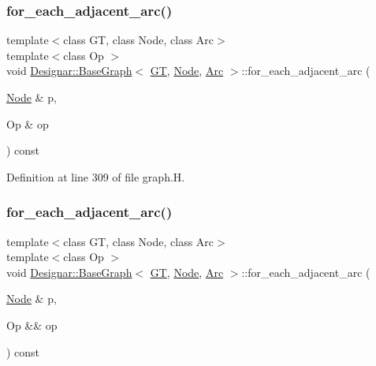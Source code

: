 \subsubsection{\texorpdfstring{for\+\_\+each\+\_\+adjacent\+\_\+arc()}{for\_each\_adjacent\_arc()}\hspace{0.1cm}{\footnotesize\ttfamily [1/2]}}
{\footnotesize\ttfamily template$<$class GT, class Node, class Arc$>$ \\
template$<$class Op $>$ \\
void \hyperlink{class_designar_1_1_base_graph}{Designar\+::\+Base\+Graph}$<$ \hyperlink{demo-buildgraph_8_c_a3001c40d2c31ca87ed96cd7d1334a55e}{GT}, \hyperlink{namespace_designar_a5af326c65aa2bd26b26c410f2030d09e}{Node}, \hyperlink{namespace_designar_a3f55fb5513d62ff47cbc8f72b8e95d6f}{Arc} $>$\+::for\+\_\+each\+\_\+adjacent\+\_\+arc (\begin{DoxyParamCaption}\item[{\hyperlink{namespace_designar_a5af326c65aa2bd26b26c410f2030d09e}{Node} \&}]{p,  }\item[{Op \&}]{op }\end{DoxyParamCaption}) const\hspace{0.3cm}{\ttfamily [inline]}}



Definition at line 309 of file graph.\+H.

\mbox{\label{class_designar_1_1_base_graph_a21553c1d96334e4cf2e0e2086e0efeba}} 
\subsubsection{\texorpdfstring{for\+\_\+each\+\_\+adjacent\+\_\+arc()}{for\_each\_adjacent\_arc()}\hspace{0.1cm}{\footnotesize\ttfamily [2/2]}}
{\footnotesize\ttfamily template$<$class GT, class Node, class Arc$>$ \\
template$<$class Op $>$ \\
void \hyperlink{class_designar_1_1_base_graph}{Designar\+::\+Base\+Graph}$<$ \hyperlink{demo-buildgraph_8_c_a3001c40d2c31ca87ed96cd7d1334a55e}{GT}, \hyperlink{namespace_designar_a5af326c65aa2bd26b26c410f2030d09e}{Node}, \hyperlink{namespace_designar_a3f55fb5513d62ff47cbc8f72b8e95d6f}{Arc} $>$\+::for\+\_\+each\+\_\+adjacent\+\_\+arc (\begin{DoxyParamCaption}\item[{\hyperlink{namespace_designar_a5af326c65aa2bd26b26c410f2030d09e}{Node} \&}]{p,  }\item[{Op \&\&}]{op }\end{DoxyParamCaption}) const\hspace{0.3cm}{\ttfamily [inline]}}



